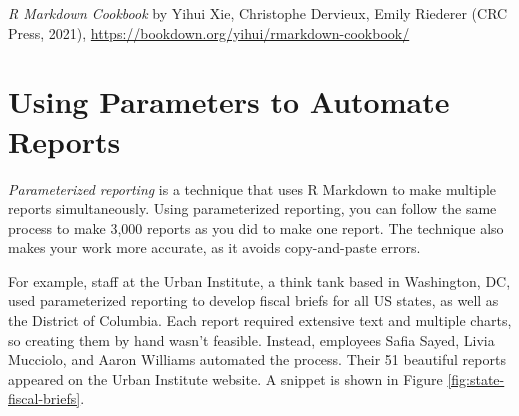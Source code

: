 \documentclass[
]{book}
\begin{document}
\emph{R Markdown Cookbook} by Yihui Xie, Christophe Dervieux, Emily Riederer (CRC Press, 2021), \url{https://bookdown.org/yihui/rmarkdown-cookbook/}

\hypertarget{parameterized-reports-chapter}{%
\chapter{Using Parameters to Automate Reports}\label{parameterized-reports-chapter}}

\emph{Parameterized reporting} is a technique that uses R Markdown to make multiple reports simultaneously. Using parameterized reporting, you can follow the same process to make 3,000 reports as you did to make one report. The technique also makes your work more accurate, as it avoids copy-and-paste errors.

For example, staff at the Urban Institute, a think tank based in Washington, DC, used parameterized reporting to develop fiscal briefs for all US states, as well as the District of Columbia. Each report required extensive text and multiple charts, so creating them by hand wasn't feasible. Instead, employees Safia Sayed, Livia Mucciolo, and Aaron Williams automated the process. Their 51 beautiful reports appeared on the Urban Institute website. A snippet is shown in Figure \ref{fig:state-fiscal-briefs}.
\end{document}
